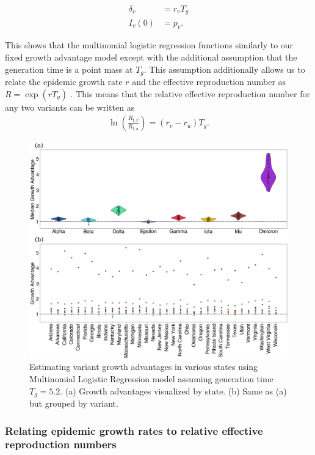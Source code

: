 \documentclass[11pt,oneside,letterpaper]{article}
\begin{document}
\begin{align}
  \delta_{v} &= r_{v}T_{g}\\
  I_{v}(0) &= p_{v}.
\end{align}

This shows that the multinomial logistic regression functions similarly to our fixed growth advantage model except with the additional assumption that the generation time is a point mass at $T_{g}$.
This assumption additionally allows us to relate the epidemic growth rate $r$ and the effective reproduction number as $R = \exp(r T_{g})$ \cite{Wallinga2006}. This means that the relative effective reproduction number for any two variants can be written as
\begin{align*}
\ln \left( \frac{R_{t,v}}{R_{t,u}} \right) = (r_{v} - r_{u}) T_{g}.
\end{align*}

\begin{figure}
  \centering
  \includegraphics[width=\linewidth]{figs/fig_MLR_growth_advantages_supp.png}
  \caption{Estimating variant growth advantages in various states using Multinomial Logistic Regression model assuming generation time $T_{g} = 5.2$.
  (a) Growth advantages visualized by state.
  (b) Same as (a) but grouped by variant.}%
  \label{fig:MLR_growth_advantages}
\end{figure}

\newpage

\subsubsection*{Relating epidemic growth rates to relative effective reproduction numbers}
\end{document}

